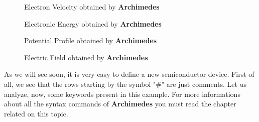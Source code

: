 \documentclass[12pt]{book}
\begin{document}
\begin{figure}[htb!]
\centerline{} 
\caption{\small Electron Velocity obtained by \textbf{Archimedes}}
\label{diode2}
\end{figure}

\begin{figure}[htb!]
\centerline{} 
\caption{\small Electronic Energy obtained by \textbf{Archimedes}}
\label{diode3}
\end{figure}

\begin{figure}[htb!]
\centerline{} 
\caption{\small Potential Profile obtained by \textbf{Archimedes}}
\label{diode4}
\end{figure}

\begin{figure}[htb!]
\centerline{} 
\caption{\small Electric Field obtained by \textbf{Archimedes}}
\label{diode5}
\end{figure}


As we will see soon, it is very easy to define a new semiconductor device. First of all, we see that the rows starting by the symbol "\#" are just comments. Let us analyze, now, some keywords present in this example. For more informations about all the syntax commands of \textbf{Archimedes} you must read the chapter related on this topic.
\end{document}
